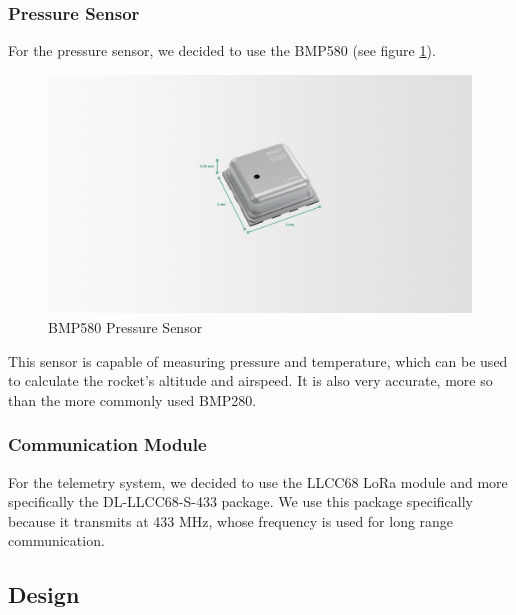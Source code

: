 \documentclass{article}
\begin{document}
\subsubsection*{Pressure Sensor}
For the pressure sensor, we decided to use the BMP580 (see figure \ref{fig:bmp580}).
\begin{figure}[p]
      \caption{BMP580 Pressure Sensor\cite{BMP580}}
      \label{fig:bmp580}
      \centering
      \includegraphics[width=\textwidth]{bmp580.jpg}
\end{figure}This sensor is capable of measuring pressure and temperature, which can be used to calculate the rocket's altitude and airspeed. It is also very accurate, more so than the more commonly used BMP280.\cite{Bosch_Sensortec_2024}

\subsubsection{Communication Module}
For the telemetry system, we decided to use the LLCC68 LoRa module and more specifically the DL-LLCC68-S-433 package. We use this package specifically because it transmits at 433 MHz, whose frequency is used for long range communication.

\subsection{Design}
\end{document}
